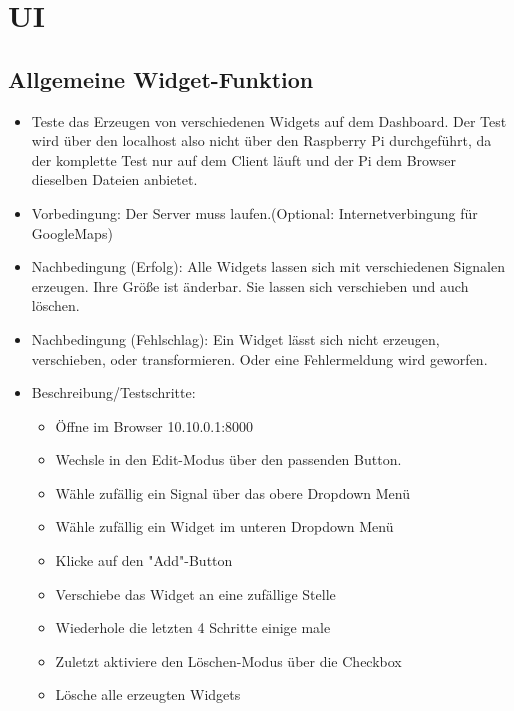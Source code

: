 \documentclass[qualitaetssicherung.tex]{subfiles}
\begin{document}
\section{UI}

	\subsection{Allgemeine Widget-Funktion}
		\begin{itemize}
			\item
			Teste das Erzeugen von verschiedenen Widgets auf dem Dashboard. Der Test wird über den localhost also nicht über den Raspberry Pi durchgeführt, da der komplette Test nur auf dem Client läuft und der Pi dem Browser dieselben Dateien anbietet.
			\item
			Vorbedingung: Der Server muss laufen.(Optional: Internetverbingung für GoogleMaps)
			\item
			Nachbedingung (Erfolg): Alle Widgets lassen sich mit verschiedenen Signalen erzeugen. Ihre Größe ist änderbar. Sie lassen sich verschieben und auch löschen. 
			\item
			Nachbedingung (Fehlschlag): Ein Widget lässt sich nicht erzeugen, verschieben, oder transformieren. Oder eine Fehlermeldung wird geworfen.
			\item
			Beschreibung/Testschritte:
			\begin{itemize}
				\item
				Öffne im Browser 10.10.0.1:8000
				\item
				Wechsle in den Edit-Modus über den passenden Button.
				\item
				Wähle zufällig ein Signal über das obere Dropdown Menü
				\item
				Wähle zufällig ein Widget im unteren Dropdown Menü
				\item
				Klicke auf den "Add"-Button
				\item
				Verschiebe das Widget an eine zufällige Stelle
				\item
				Wiederhole die letzten 4 Schritte einige male
				\item
				Zuletzt aktiviere den Löschen-Modus über die Checkbox
				\item
				Lösche alle erzeugten Widgets
			\end{itemize}
		\end{itemize}
		
\end{document}
